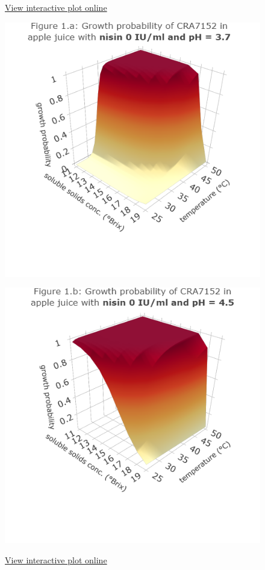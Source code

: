\documentclass[
  12pt,
]{article}
\begin{document}
\begin{figure}
\centering
\begin{minipage}{.5\textwidth}
  \centering
  \caption*{\hypersetup{urlcolor=blue}\href{https://chart-studio.plotly.com/~valentinoli/7/}{View interactive plot online}}
  \includegraphics[width=\linewidth]{fig1a}
  \label{fig1a}
\end{minipage}%
\begin{minipage}{.5\textwidth}
  \centering
  \caption*{\hypersetup{urlcolor=blue}\href{https://chart-studio.plotly.com/~valentinoli/9/}{View interactive plot online}}
  \includegraphics[width=\linewidth]{fig1b}
  \label{fig1b}
\end{minipage}
\end{figure}
\end{document}
